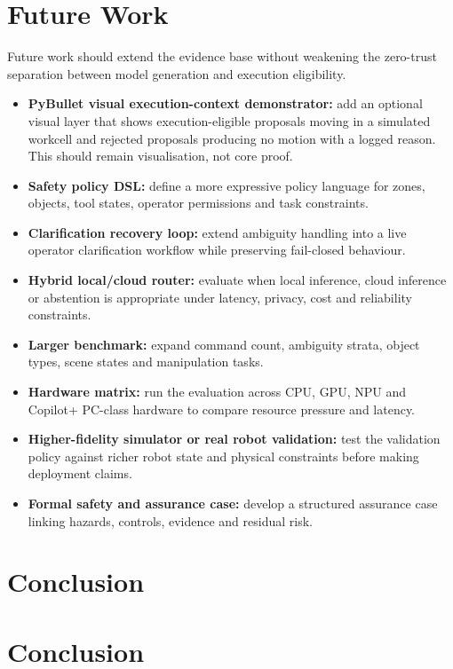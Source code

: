 \documentclass[sigconf,nonacm]{acmart}
\begin{document}
\section{Future Work}
\label{sec:future_work}

Future work should extend the evidence base without weakening the zero-trust separation between model generation and execution eligibility.

\begin{itemize}
    \item \textbf{PyBullet visual execution-context demonstrator:} add an optional visual layer that shows execution-eligible proposals moving in a simulated workcell and rejected proposals producing no motion with a logged reason. This should remain visualisation, not core proof.
    \item \textbf{Safety policy DSL:} define a more expressive policy language for zones, objects, tool states, operator permissions and task constraints.
    \item \textbf{Clarification recovery loop:} extend ambiguity handling into a live operator clarification workflow while preserving fail-closed behaviour.
    \item \textbf{Hybrid local/cloud router:} evaluate when local inference, cloud inference or abstention is appropriate under latency, privacy, cost and reliability constraints.
    \item \textbf{Larger benchmark:} expand command count, ambiguity strata, object types, scene states and manipulation tasks.
    \item \textbf{Hardware matrix:} run the evaluation across CPU, GPU, NPU and Copilot+ PC-class hardware to compare resource pressure and latency.
    \item \textbf{Higher-fidelity simulator or real robot validation:} test the validation policy against richer robot state and physical constraints before making deployment claims.
    \item \textbf{Formal safety and assurance case:} develop a structured assurance case linking hazards, controls, evidence and residual risk.
\end{itemize}

\section{Conclusion}

\section{Conclusion}
\end{document}
